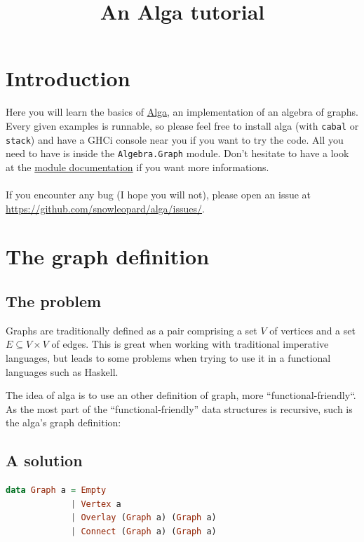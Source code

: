 \documentclass[10pt,a4paper]{article}
\title{An Alga tutorial}
\date{}
\begin{document}
\maketitle
\tableofcontents
\section{Introduction}

Here you will learn the basics of \href{http://hackage.haskell.org/package/algebraic-graphs}{Alga}, an implementation of an algebra of graphs.
Every given examples is runnable, so please feel free to install alga (with \verb|cabal| or \verb|stack|) and have a GHCi console near you if you want to try the code. All you need to have is inside the \verb|Algebra.Graph| module. Don't hesitate to have a look at the \href{http://hackage.haskell.org/package/algebraic-graphs-0.1.1.1/docs/Algebra-Graph.html}{module documentation} if you want more informations.
\\
\\
If you encounter any bug (I hope you will not), please open an issue at \url{https://github.com/snowleopard/alga/issues/}.

\section{The graph definition}
\subsection{The problem}
Graphs are traditionally defined as a pair comprising a set $V$ of vertices and a set $E \subseteq V \times V$ of edges. This is great when working with traditional imperative languages, but leads to some problems when trying to use it in a functional languages such as Haskell.

The idea of alga is to use an other definition of graph, more ``functional-friendly``. As the most part of the ``functional-friendly” data structures is recursive, such is the alga’s graph definition:

\subsection{A solution}
\begin{lstlisting}[language=Haskell, frame=single]
data Graph a = Empty
             | Vertex a
             | Overlay (Graph a) (Graph a)
             | Connect (Graph a) (Graph a)
\end{lstlisting}
\end{document}
